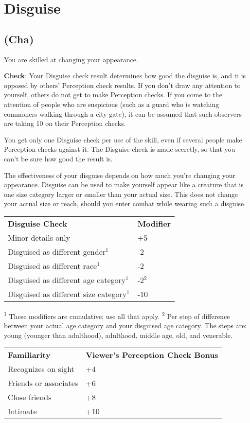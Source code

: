 \section{Disguise}

\label{f0}
\subsection{(Cha)}

				
You are skilled at changing your appearance.
				
\textbf{Check}: Your Disguise check result determines how good the disguise is, and it is opposed by others' Perception check results. If you don't draw any attention to yourself, others do not get to make Perception checks. If you come to the attention of people who are suspicious (such as a guard who is watching commoners walking through a city gate), it can be assumed that such observers are taking 10 on their Perception checks.
				
You get only one Disguise check per use of the skill, even if several people make Perception checks against it. The Disguise check is made secretly, so that you can't be sure how good the result is.
				
The effectiveness of your disguise depends on how much you're changing your appearance. Disguise can be used to make yourself appear like a creature that is one size category larger or smaller than your actual size. This does not change your actual size or reach, should you enter combat while wearing such a disguise.

\begin{table}
 \sffamily
 \begin{tabular}{ll}
\textbf{Disguise Check} & \textbf{Modifier}\\
Minor details only & +5\\
Disguised as different gender\(^{1}\) & -2\\
Disguised as different race\(^{1}\) & -2\\
Disguised as different age category\(^{1}\) & -2\(^{2}\) \\
Disguised as different size category\(^{1}\) & -10 \\
 \end{tabular}
 \textsuperscript{1} These modifiers are cumulative; use all that apply.
\textsuperscript{2} Per step of difference between your actual age category and your disguised age category. The steps are: young (younger than adulthood), adulthood, middle age, old, and venerable.
\end{table}
\begin{table}
 \begin{tabular}{ll}
\textbf{Familiarity}  & \textbf{Viewer's Perception Check Bonus}\\
Recognizes on sight & +4\\
Friends or associates & +6\\
Close friends & +8\\
Intimate & +10\\
 \end{tabular}
\end{table}

